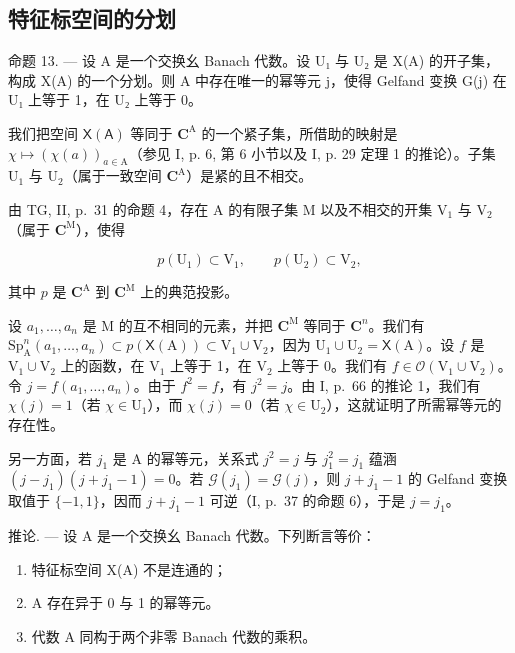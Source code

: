 \subsection{特征标空间的分划}

命题 13. --- 设 A 是一个交换幺 Banach 代数。设 U₁ 与 U₂ 是 X(A) 的开子集，构成 X(A) 的一个分划。则 A 中存在唯一的幂等元 j，使得 Gelfand 变换 G(j) 在 U₁ 上等于 1，在 U₂ 上等于 0。

我们把空间 \(\mathsf{X}(\mathsf{A})\) 等同于 \(\mathbf{C}^{\mathrm{A}}\) 的一个紧子集，所借助的映射是 \(\chi \mapsto (\chi (a))_{a\in \mathrm{A}}\)（参见 I, p. 6, 第 6 小节以及 I, p. 29 定理 1 的推论）。子集 \(\mathrm{U}_1\) 与 \(\mathrm{U}_2\)（属于一致空间 \(\mathbf{C}^{\mathrm{A}}\)）是紧的且不相交。

由 TG, II, p.~31 的命题 4，存在 A 的有限子集 M 以及不相交的开集 \(\mathrm{V}_{1}\) 与 \(\mathrm{V}_{2}\)（属于 \(\mathbf{C}^{\mathrm{M}}\)），使得

\[
p (\mathrm{U} _ {1}) \subset \mathrm{V} _ {1}, \qquad p (\mathrm{U} _ {2}) \subset \mathrm{V} _ {2},
\]

其中 \(p\) 是 \(\mathbf{C}^{\mathrm{A}}\) 到 \(\mathbf{C}^{\mathrm{M}}\) 上的典范投影。

设 \(a_1, \ldots, a_n\) 是 M 的互不相同的元素，并把 \(\mathbf{C}^{\mathrm{M}}\) 等同于 \(\mathbf{C}^n\)。我们有 \(\mathrm{Sp}_{\mathrm{A}}^{n}(a_{1}, \ldots, a_{n}) \subset p(\mathsf{X}(\mathrm{A})) \subset \mathrm{V}_{1} \cup \mathrm{V}_{2}\)，因为 \(\mathrm{U}_{1} \cup \mathrm{U}_{2} = \mathsf{X}(\mathrm{A})\)。设 \(f\) 是 \(\mathrm{V}_{1} \cup \mathrm{V}_{2}\) 上的函数，在 \(\mathrm{V}_{1}\) 上等于 1，在 \(\mathrm{V}_{2}\) 上等于 0。我们有 \(f \in \mathcal{O}(\mathrm{V}_{1} \cup \mathrm{V}_{2})\)。令 \(j = f(a_{1}, \ldots, a_{n})\)。由于 \(f^{2} = f\)，有 \(j^{2} = j\)。由 I, p.~66 的推论 1，我们有 \(\chi(j) = 1\)（若 \(\chi \in \mathrm{U}_{1}\)），而 \(\chi(j) = 0\)（若 \(\chi \in \mathrm{U}_{2}\)），这就证明了所需幂等元的存在性。

另一方面，若 \(j_{1}\) 是 A 的幂等元，关系式 \(j^{2} = j\) 与 \(j_{1}^{2} = j_{1}\) 蕴涵 \((j - j_{1})(j + j_{1} - 1) = 0\)。若 \(\mathcal{G}(j_{1}) = \mathcal{G}(j)\)，则 \(j + j_{1} - 1\) 的 Gelfand 变换取值于 \(\{-1, 1\}\)，因而 \(j + j_{1} - 1\) 可逆（I, p.~37 的命题 6），于是 \(j = j_{1}\)。

推论. --- 设 A 是一个交换幺 Banach 代数。下列断言等价：

\begin{enumerate}
\def\labelenumi{\alph{enumi})}
\item
  特征标空间 X(A) 不是连通的；
\item
  A 存在异于 0 与 1 的幂等元。
\item
  代数 A 同构于两个非零 Banach 代数的乘积。
\end{enumerate}

